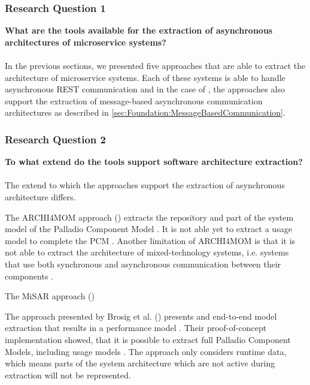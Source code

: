 \subsubsection{Research Question 1}
\textbf{What are the tools available for the extraction of asynchronous architectures of microservice systems?}
\\ \\
In the previous sections, we presented five approaches that are able to extract the architecture of microservice systems.
Each of these systems is able to handle asynchronous REST communication and in the case of \cite{Singh2022ARCHI4MOM,Alshuqayran2018MiSAR,Brosig2011}, the approaches also support the extraction of message-based asynchronous communication architectures as described in \autoref{sec:Foundation:MessageBasedCommunication}.

\subsubsection{Research Question 2}
\textbf{To what extend do the tools support software architecture extraction?}
\\ \\
The extend to which the approaches support the extraction of asynchronous architecture differs.

The ARCHI4MOM approach (\cite{Singh2022ARCHI4MOM}) extracts the repository and part of the system model of the Palladio Component Model \cite{Singh2022ARCHI4MOM}.
It is not able yet to extract a usage model to complete the PCM \cite{Singh2022ARCHI4MOM}.
Another limitation of ARCHI4MOM is that it is not able to extract the architecture of mixed-technology systems, i.e. systems that use both synchronous and asynchronous communication between their components \cite{Singh2022ARCHI4MOM}.

The MiSAR approach (\cite{Alshuqayran2018MiSAR}) 

The approach presented by Brosig et al. (\cite{Brosig2011}) presents and end-to-end model extraction that results in a performance model \cite{Brosig2011}.
Their proof-of-concept implementation showed, that it is possible to extract full Palladio Component Models, including usage models \cite{Brosig2011}.
The approach only considers runtime data, which means parts of the system architecture which are not active during extraction will not be represented.


